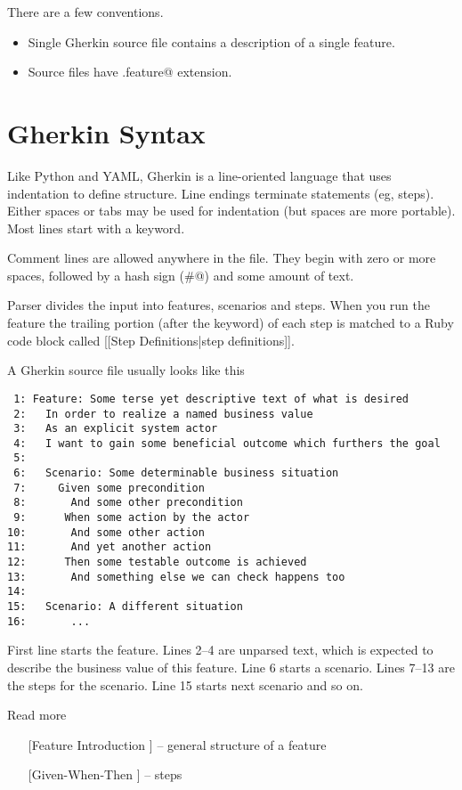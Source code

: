 \documentclass[10pt]{book}
\begin{document}
There are a few conventions.

\begin{itemize}
  \item Single Gherkin source file contains a description of a single feature.
  \item Source files have \verb@.feature@ extension.
\end{itemize}

\section{Gherkin Syntax}

Like Python and YAML, Gherkin is a line-oriented language that uses indentation to define structure. Line endings terminate statements (eg, steps). Either spaces or tabs may be used for indentation (but spaces are more portable). Most lines start with a keyword.

Comment lines are allowed anywhere in the file. They begin with zero or more spaces, followed by a hash sign (\verb@#@) and some amount of text.

Parser divides the input into features, scenarios and steps.  When you run the feature the trailing portion (after the keyword) of each step is matched to a Ruby code block called [[Step Definitions|step definitions]].

A Gherkin source file usually looks like this

\begin{verbatim}
 1: Feature: Some terse yet descriptive text of what is desired
 2:   In order to realize a named business value
 3:   As an explicit system actor
 4:   I want to gain some beneficial outcome which furthers the goal
 5: 
 6:   Scenario: Some determinable business situation
 7:     Given some precondition
 8:       And some other precondition
 9:      When some action by the actor
10:       And some other action
11:       And yet another action
12:      Then some testable outcome is achieved
13:       And something else we can check happens too
14: 
15:   Scenario: A different situation
16:       ...

\end{verbatim}
First line starts the feature. Lines 2–4 are unparsed text, which is expected to describe the business value of this feature. Line 6 starts a scenario. Lines 7–13 are the steps for the scenario. Line 15 starts next scenario and so on.

Read more

\begin{itemize}
  \item [[Feature Introduction]] -- general structure of a feature
  \item [[Given-When-Then]] -- steps
\end{itemize}
\end{document}
